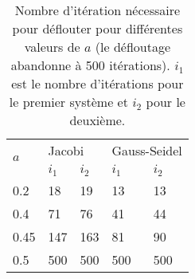 \begin{table}
  \centering
  \begin{tabular}{|l|l|l|l|l|}
    \hline
    \multirow{2}{*}{$a$} & \multicolumn{2}{l|}{Jacobi} & \multicolumn{2}{l|}{Gauss-Seidel}\\
    \cline{2-5}
        & $i_1$ & $i_2$ & $i_1$ & $i_2$\\
    \hline
    0.2 & 18    & 19    & 13    & 13\\
    \hline
    0.4 & 71    & 76    & 41    & 44\\
    \hline
    0.45& 147   & 163   & 81    & 90\\
    \hline
    0.5 & 500   & 500   & 500   & 500\\
    \hline
  \end{tabular}
  \caption{Nombre d'itération nécessaire pour déflouter pour différentes valeurs de $a$ (le défloutage abandonne à 500 itérations).
  $i_1$ est le nombre d'itérations pour le premier système et $i_2$ pour le deuxième.}
  \label{tab:iter}
\end{table}

